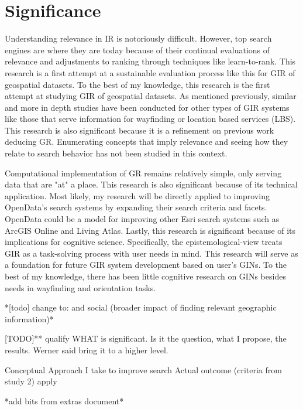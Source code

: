 \chapter{Significance} \label{ch:[chapter 6 label]}

Understanding relevance in IR is notoriously difficult. However, top search engines are where they are today because of their continual evaluations of relevance and adjustments to ranking through techniques like learn-to-rank. This research is a first attempt at a sustainable evaluation process like this for GIR of geospatial datasets. To the best of my knowledge, this research is the first attempt at studying GIR of geospatial datasets. As mentioned previously, similar and more in depth studies have been conducted for other types of GIR systems like those that serve information for wayfinding or location based services (LBS). This research is also significant because it is a refinement on previous work deducing GR. Enumerating concepts that imply relevance and seeing how they relate to search behavior has not been studied in this context.

Computational implementation of GR remains relatively simple, only serving data that are "at" a place. This research is also significant because of its technical application. Most likely, my research will be directly applied to improving OpenData’s search systems by expanding their search criteria and facets. OpenData could be a model for improving other Esri search systems such as ArcGIS Online and Living Atlas. Lastly, this research is significant because of its implications for cognitive science. Specifically, the epistemological-view treats GIR as a task-solving process with user needs in mind. This research will serve as a foundation for future GIR system development based on user’s GINs. To the best of my knowledge, there has been little cognitive research on GINs besides needs in wayfinding and orientation tasks.

*[todo] change to: and social (broader impact of finding relevant geographic information)*

[TODO]** qualify WHAT is significant. Is it the question, what I propose, the results. Werner said bring it to a higher level.

Conceptual Approach I take to improve search
Actual outcome (criteria from study 2)
apply


*add bits from extras document*